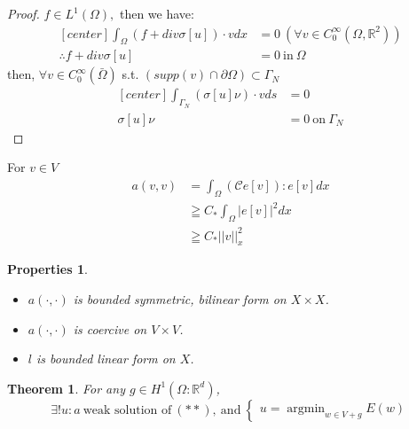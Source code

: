 \documentclass[a4paper,11pt]{article}
\newtheorem{prop}{Properties}
\newtheorem{theorem}{Theorem}
\newcommand{\R}{\mathbb{R}}
\newcommand{\Cmod}{\mathcal{C}}
\DeclareMathOperator*{\argmin}{argmin}
\begin{document}
\begin{proof}
	$f \in L^1(\Omega),$ then we have:
	\begin{equation*}
	\begin{aligned}[center]
	\int_\Omega (f + div \sigma[u]) \cdot v dx &= 0\ (\forall v \in C_0^\infty(\Omega,\R^2))\\
	\therefore f + div \sigma[u] &= 0\ \text{in}\ \Omega
	\end{aligned}
	\end{equation*}
	then, $\forall v \in C_0^\infty (\bar{\Omega})$ s.t. $(supp(v) \cap \partial\Omega) \subset \Gamma_N$
	\begin{equation*}
	\begin{aligned}[center]
	\int_{\Gamma_N} (\sigma[u]\nu)\cdot v ds &= 0\\
	\sigma[u]\nu &= 0\ \text{on}\ \Gamma_N
	\end{aligned}
	\end{equation*}
\end{proof}
For $v \in V$
\begin{equation*}
\begin{aligned}
a(v,v) &= \int_\Omega (\Cmod e[v]) : e[v] dx\\
&\geqq C_* \int_\Omega |e[v]|^2 dx\\
&\geqq C_* ||v||^2_x
\end{aligned}
\end{equation*}
\begin{prop}
	\begin{itemize}
		\item $a(\cdot,\cdot)$ is bounded symmetric, bilinear form on $X \times X$.
		\item $a(\cdot,\cdot)$ is coercive on $V \times V$.
		\item $l$ is bounded linear form on $X$.
	\end{itemize}
\end{prop}
\begin{theorem}
	For any $g\in H^1(\Omega : \R^d)$,
	\begin{equation*}
	\exists! u:a\ \text{weak solution of}\ (**),\ \text{and}\ \begin{cases}
	u=\argmin_{w\in V+g}E(w)
	\end{cases}
	\end{equation*}
\end{theorem}
\newpage
\end{document}
